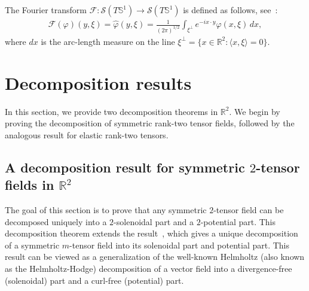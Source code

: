 \documentclass[11pt]{article}
\newcommand{\D}{\mathrm{d}}
\newcommand{\vf}{\varphi}
\newcommand{\Fc}{\mathcal{F}}
\newcommand{\Sc}{\mathcal{S}}
\newcommand{\Rb}{\mathbb{R}}
\newcommand{\Sb}{\mathbb{S}}
\newcommand*{\Rt}{\mathbb{R}^2}
\renewcommand{\l}{\langle}
\renewcommand{\r}{\rangle}
\newtheorem{definition}[theorem]{Definition}
\newcommand{\antti}[1]{\textcolor{red}{Antti's comment: #1}}
\begin{document}
The Fourier transform  $\Fc :\Sc(T\Sb^1) \longrightarrow \Sc(T\Sb^1)$ is defined as follows, see~\cite[Section 2.1]{Sharafutdinov_book}:
\begin{align}\label{eq:Fourier transform on sphere bundle}
    \Fc (\vf) (y, \xi) =    \widehat{\vf}(y, \xi) = \frac{1}{(2 \pi)^{1/2}}\int_{\xi^\perp} e^{-i x\cdot y} \vf(x, \xi)\, dx,
\end{align}
where $dx$ is the arc-length measure on the line $\xi^\perp = \{ x\in \Rb^2 : \l x,\xi \r = 0\}.$

\section{Decomposition results}
In this section, we provide two decomposition theorems in $\Rt$. We begin by proving the decomposition of symmetric rank-two tensor fields, followed by the analogous result for elastic rank-two tensors. 
\subsection{A decomposition result for symmetric $2$-tensor fields in \texorpdfstring{$\Rb^2$}{}}\label{sec:Decomposition Results}
The goal of this section is to prove that any symmetric $2$-tensor field can be decomposed uniquely into a $2$-solenoidal part and a $2$-potential part. This decomposition theorem extends the result~\cite[Theorem 2.6.2]{Sharafutdinov_book}, which gives a unique decomposition of a symmetric $m$-tensor field into its solenoidal part and potential part. This result can be viewed as a generalization of the well-known Helmholtz (also known as the Helmholtz-Hodge) decomposition of a vector field into a divergence-free (solenoidal) part and a curl-free (potential) part.
\end{document}
